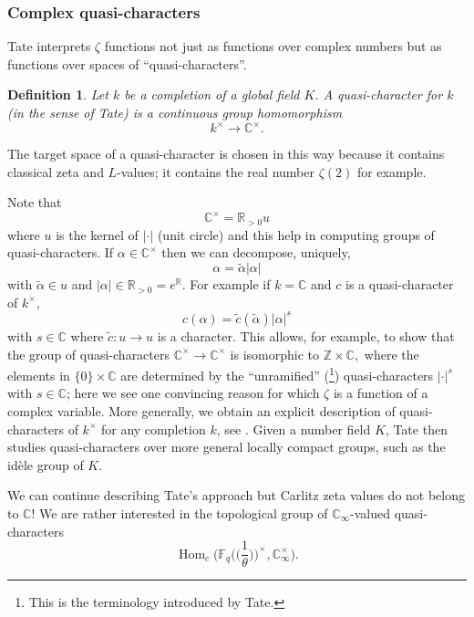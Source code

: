 \documentclass[11pt]{amsart}
\numberwithin{equation}{section}
\newcommand{\ZZ}{\mathbb{Z}}
\newcommand{\FF}{\mathbb{F}}
\newcommand{\CC}{\mathbb{C}}
\newcommand{\RR}{\mathbb{R}}
\newtheorem{Definition}[Theorem]{Definition}
\begin{document}
\subsubsection*{Complex quasi-characters}
Tate interprets $\zeta$ functions not just as functions over complex numbers but as functions over spaces of 
``quasi-characters''. 
\begin{Definition}{\em Let $k$ be a completion of a global field $K$. 
A {\em quasi-character} for $k$ (in the sense of Tate) is a continuous group homomorphism 
$$k^\times\rightarrow\CC^\times.$$
}
\end{Definition}
 The target space of a quasi-character is chosen in this way because it contains classical zeta and $L$-values; it contains the real number $\zeta(2)$ for example.

Note that
\begin{equation}\label{structure-of-Ctimes}
\CC^\times=\RR_{>0}u
\end{equation}
where $u$ is the kernel of $|\cdot|$ (unit circle) and this help in computing groups of quasi-characters. If $\alpha\in\CC^\times$ then we can decompose, uniquely, $$\alpha=\tilde{\alpha}|\alpha|$$ with $\tilde{\alpha}\in u$ and $|\alpha|\in\RR_{>0}=e^\RR$. For example if
$k=\CC$ and $c$ is a quasi-character of $k^\times$,
$$c(\alpha)=\tilde{c}(\tilde{\alpha})|\alpha|^s$$ with $s\in\CC$ where $\tilde{c}:u\rightarrow u$ is a character. This allows, for example, to 
show that the group of quasi-characters $\CC^\times\rightarrow\CC^\times$ is isomorphic to 
$\ZZ\times\CC,$ where the elements in $\{0\}\times\CC$
are determined by the ``unramified'' (\footnote{This is the terminology introduced by Tate.}) quasi-characters $|\cdot|^s$ with $s\in\CC$; here we see one convincing reason for which $\zeta$ is a function of a complex variable.
More generally, we obtain an explicit description of quasi-characters of $k^\times$ for any completion $k$, see
\cite[\S 2.3]{TAT}. Given a number field $K$, Tate then studies quasi-characters over more general locally compact groups, such as the id\`ele group of $K$.

We can continue describing Tate's approach but Carlitz zeta values do not belong to $\CC$! 
We are rather interested in the topological group of $\CC_\infty$-valued quasi-characters
$$\operatorname{Hom}_c\Big(\FF_q\big(\!\big(\frac{1}{\theta}\big)\!\big)^\times,\CC_\infty^\times\Big).$$ 
\end{document}
